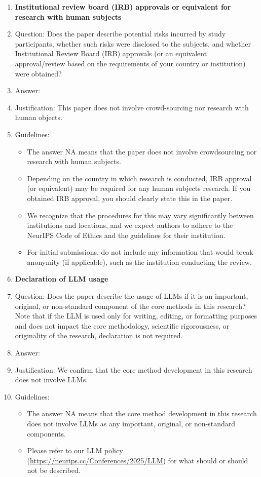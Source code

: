 \documentclass{article}
\begin{document}
\begin{enumerate}
\item {\bf Institutional review board (IRB) approvals or equivalent for research with human subjects}
    \item[] Question: Does the paper describe potential risks incurred by study participants, whether such risks were disclosed to the subjects, and whether Institutional Review Board (IRB) approvals (or an equivalent approval/review based on the requirements of your country or institution) were obtained?
    \item[] Answer: \answerNA{} %
    \item[] Justification: This paper does not involve crowd-sourcing nor research with human objects.
    \item[] Guidelines:
    \begin{itemize}
        \item The answer NA means that the paper does not involve crowdsourcing nor research with human subjects.
        \item Depending on the country in which research is conducted, IRB approval (or equivalent) may be required for any human subjects research. If you obtained IRB approval, you should clearly state this in the paper. 
        \item We recognize that the procedures for this may vary significantly between institutions and locations, and we expect authors to adhere to the NeurIPS Code of Ethics and the guidelines for their institution. 
        \item For initial submissions, do not include any information that would break anonymity (if applicable), such as the institution conducting the review.
    \end{itemize}

\item {\bf Declaration of LLM usage}
    \item[] Question: Does the paper describe the usage of LLMs if it is an important, original, or non-standard component of the core methods in this research? Note that if the LLM is used only for writing, editing, or formatting purposes and does not impact the core methodology, scientific rigorousness, or originality of the research, declaration is not required.
    \item[] Answer: \answerNA{} %
    \item[] Justification: We confirm that the core method development in this research does not involve LLMs.
    \item[] Guidelines:
    \begin{itemize}
        \item The answer NA means that the core method development in this research does not involve LLMs as any important, original, or non-standard components.
        \item Please refer to our LLM policy (\url{https://neurips.cc/Conferences/2025/LLM}) for what should or should not be described.
    \end{itemize}




\end{enumerate}
\end{document}
